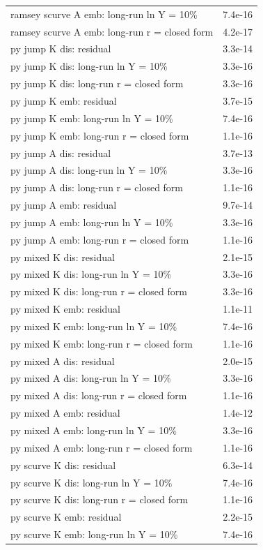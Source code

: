 \begin{tabular}{lc}
ramsey scurve A emb: long-run ln Y = 10\% & 7.4e-16\\
ramsey scurve A emb: long-run r = closed form & 4.2e-17\\
py jump K dis: residual & 3.3e-14\\
py jump K dis: long-run ln Y = 10\% & 3.3e-16\\
py jump K dis: long-run r = closed form & 3.3e-16\\
py jump K emb: residual & 3.7e-15\\
py jump K emb: long-run ln Y = 10\% & 7.4e-16\\
py jump K emb: long-run r = closed form & 1.1e-16\\
py jump A dis: residual & 3.7e-13\\
py jump A dis: long-run ln Y = 10\% & 3.3e-16\\
py jump A dis: long-run r = closed form & 1.1e-16\\
py jump A emb: residual & 9.7e-14\\
py jump A emb: long-run ln Y = 10\% & 3.3e-16\\
py jump A emb: long-run r = closed form & 1.1e-16\\
py mixed K dis: residual & 2.1e-15\\
py mixed K dis: long-run ln Y = 10\% & 3.3e-16\\
py mixed K dis: long-run r = closed form & 3.3e-16\\
py mixed K emb: residual & 1.1e-11\\
py mixed K emb: long-run ln Y = 10\% & 7.4e-16\\
py mixed K emb: long-run r = closed form & 1.1e-16\\
py mixed A dis: residual & 2.0e-15\\
py mixed A dis: long-run ln Y = 10\% & 3.3e-16\\
py mixed A dis: long-run r = closed form & 1.1e-16\\
py mixed A emb: residual & 1.4e-12\\
py mixed A emb: long-run ln Y = 10\% & 3.3e-16\\
py mixed A emb: long-run r = closed form & 1.1e-16\\
py scurve K dis: residual & 6.3e-14\\
py scurve K dis: long-run ln Y = 10\% & 7.4e-16\\
py scurve K dis: long-run r = closed form & 1.1e-16\\
py scurve K emb: residual & 2.2e-15\\
py scurve K emb: long-run ln Y = 10\% & 7.4e-16\\

\end{tabular}
